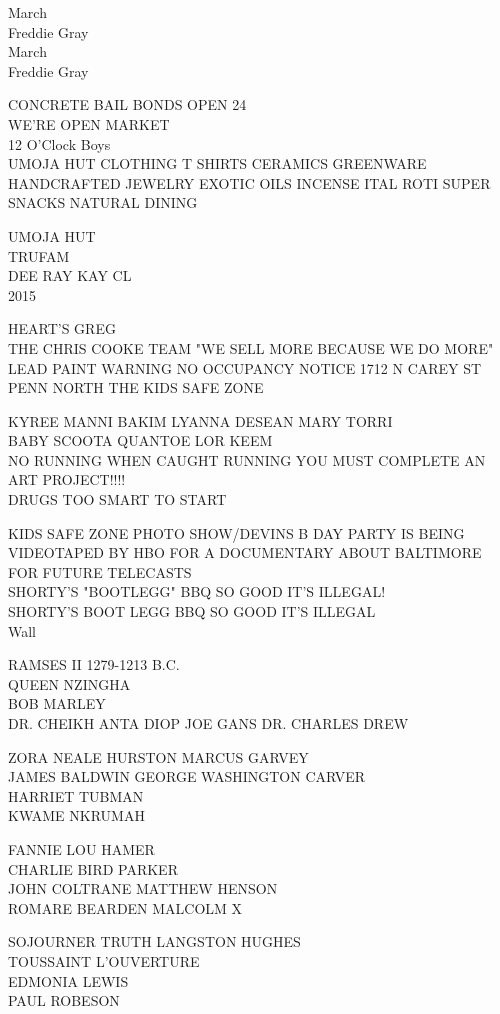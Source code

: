 \documentclass[10pt,letterpaper]{article}
\begin{document}
March\\
Freddie Gray\\
March\\
Freddie Gray

CONCRETE BAIL BONDS OPEN 24\\
WE'RE OPEN MARKET\\
12 O'Clock Boys\\
UMOJA HUT CLOTHING T SHIRTS CERAMICS GREENWARE HANDCRAFTED JEWELRY EXOTIC OILS INCENSE ITAL ROTI SUPER SNACKS NATURAL DINING

UMOJA HUT\\
TRUFAM\\
DEE RAY KAY CL\\
2015

HEART'S GREG\\
THE CHRIS COOKE TEAM "WE SELL MORE BECAUSE WE DO MORE"\\
LEAD PAINT WARNING NO OCCUPANCY NOTICE 1712 N CAREY ST\\
PENN NORTH THE KIDS SAFE ZONE

KYREE MANNI BAKIM LYANNA DESEAN MARY TORRI\\
BABY SCOOTA QUANTOE LOR KEEM\\
NO RUNNING WHEN CAUGHT RUNNING YOU MUST COMPLETE AN ART PROJECT!!!!\\
DRUGS TOO SMART TO START

KIDS SAFE ZONE PHOTO SHOW/DEVINS B DAY PARTY IS BEING VIDEOTAPED BY HBO FOR A DOCUMENTARY ABOUT BALTIMORE FOR FUTURE TELECASTS\\
SHORTY'S "BOOTLEGG" BBQ SO GOOD IT'S ILLEGAL!\\
SHORTY'S BOOT LEGG BBQ SO GOOD IT'S ILLEGAL\\
Wall

RAMSES II 1279{-}1213 B.C.\\
QUEEN NZINGHA\\
BOB MARLEY\\
DR. CHEIKH ANTA DIOP JOE GANS DR. CHARLES DREW

ZORA NEALE HURSTON MARCUS GARVEY\\
JAMES BALDWIN GEORGE WASHINGTON CARVER\\
HARRIET TUBMAN\\
KWAME NKRUMAH

FANNIE LOU HAMER\\
CHARLIE BIRD PARKER\\
JOHN COLTRANE MATTHEW HENSON\\
ROMARE BEARDEN MALCOLM X

SOJOURNER TRUTH LANGSTON HUGHES\\
TOUSSAINT L'OUVERTURE\\
EDMONIA LEWIS\\
PAUL ROBESON
\end{document}
